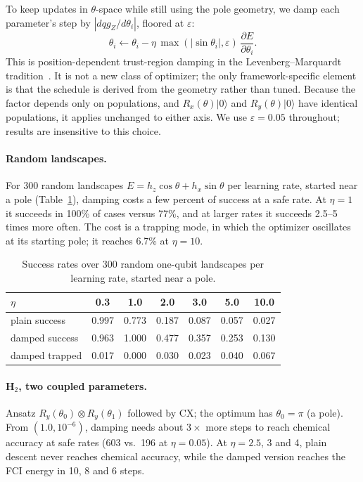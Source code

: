 \documentclass[11pt]{article}
\newcommand{\qgZ}{qg_Z}
\begin{document}
To keep updates in $\theta$-space while still using the pole geometry, we damp each parameter's
step by $|d\qgZ/d\theta_i|$, floored at $\varepsilon$:
\begin{equation}
  \theta_i\leftarrow\theta_i-\eta\,\max(|\sin\theta_i|,\varepsilon)\,\frac{\partial E}{\partial\theta_i}.
\end{equation}
This is position-dependent trust-region damping in the Levenberg--Marquardt
tradition~\cite{levenberg1944,marquardt1963}. It is not a new class of optimizer; the only
framework-specific element is that the schedule is derived from the geometry rather than tuned.
Because the factor depends only on populations, and $R_x(\theta)|0\rangle$ and $R_y(\theta)|0\rangle$
have identical populations, it applies unchanged to either axis. We use $\varepsilon=0.05$ throughout;
results are insensitive to this choice.

\paragraph{Random landscapes.} For 300 random landscapes $E=h_z\cos\theta+h_x\sin\theta$ per
learning rate, started near a pole (Table~\ref{tab:robust}), damping costs a few percent of success at a safe
rate. At $\eta=1$ it succeeds in 100\% of cases versus 77\%, and at larger rates it succeeds 2.5--5 times more often.
The cost is a trapping mode, in which the optimizer oscillates at its starting pole; it reaches
6.7\% at $\eta=10$.

\begin{table}[t]
\centering\small
\caption{Success rates over 300 random one-qubit landscapes per learning rate, started near a pole.}
\label{tab:robust}
\begin{tabular}{lcccccc}
\toprule
$\eta$ & 0.3 & 1.0 & 2.0 & 3.0 & 5.0 & 10.0\\
\midrule
plain success & 0.997 & 0.773 & 0.187 & 0.087 & 0.057 & 0.027\\
damped success & 0.963 & 1.000 & 0.477 & 0.357 & 0.253 & 0.130\\
damped trapped & 0.017 & 0.000 & 0.030 & 0.023 & 0.040 & 0.067\\
\bottomrule
\end{tabular}
\end{table}

\paragraph{H$_2$, two coupled parameters.} Ansatz $R_y(\theta_0)\otimes R_y(\theta_1)$ followed by CX; the optimum
has $\theta_0=\pi$ (a pole). From $(1.0,10^{-6})$, damping needs about $3\times$ more steps to reach
chemical accuracy at safe rates (603 vs.\ 196 at $\eta=0.05$). At $\eta=2.5$, 3 and 4, plain
descent never reaches chemical accuracy, while the damped version reaches the FCI energy in 10, 8 and
6 steps.
\end{document}
